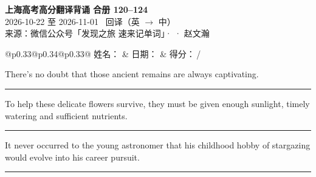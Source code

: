 \documentclass[11pt,a4paper]{article}
\newcommand{\num}[1]{\makebox[1.9em][r]{#1.}\hspace{0.3em}}
\newcommand{\wline}{\noindent\rule{\linewidth}{0.4pt}}
\begin{document}
\pagestyle{plain}
\begin{center}
{\LARGE\bfseries 上海高考高分翻译背诵 \quad 合册 120–124}\\[0.25em]
{\large 2026-10-22 至 2026-11-01 \quad\ 回译（英 $\to$ 中）}\\[0.35em]
{\footnotesize 来源：微信公众号「发现之旅 速来记单词」·  · 赵文瀚}
\end{center}

\vspace{0.4em}
\noindent\begin{tabular}{@{}p{0.33\textwidth}@{}p{0.34\textwidth}@{}p{0.33\textwidth}@{}}
姓名：\underline{\hspace{2.0cm}} & 日期：\underline{\hspace{2.0cm}} & 得分：\underline{\hspace{1.4cm}}\,/ \\
\end{tabular}

\vspace{0.5em}

\vspace{0.8em}
\vspace{0.35em}\vspace{0.15em}

\begin{minipage}{\linewidth}

\num{1}There’s no doubt that those ancient remains are always captivating.

\vspace{0.25em}

\wline

\end{minipage}

\begin{minipage}{\linewidth}

\num{2}To help these delicate flowers survive, they must be given enough sunlight, timely watering and sufficient nutrients.

\vspace{0.25em}

\wline

\end{minipage}

\begin{minipage}{\linewidth}

\num{3}It never occurred to the young astronomer that his childhood hobby of stargazing would evolve into his career pursuit.

\vspace{0.25em}

\wline

\end{minipage}
\end{document}
